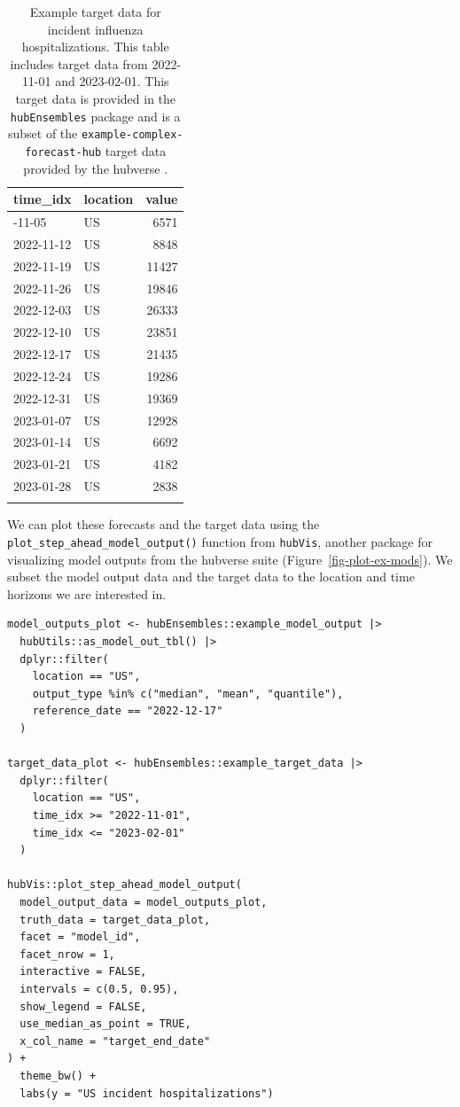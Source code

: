 \documentclass[
  article,
  shortnames,
  notitle]{jss}
\begin{document}
\begin{longtable}[]{@{}llr@{}}

\toprule\noalign{}
time\_idx & location & value \\
\midrule\noalign{}
\endhead
\bottomrule\noalign{}
\endlastfoot
2022-11-05 & US & 6571 \\
2022-11-12 & US & 8848 \\
2022-11-19 & US & 11427 \\
2022-11-26 & US & 19846 \\
2022-12-03 & US & 26333 \\
2022-12-10 & US & 23851 \\
2022-12-17 & US & 21435 \\
2022-12-24 & US & 19286 \\
2022-12-31 & US & 19369 \\
2023-01-07 & US & 12928 \\
2023-01-14 & US & 6692 \\
2023-01-21 & US & 4182 \\
2023-01-28 & US & 2838 \\


\caption{\label{tbl-example-target-data}Example target data for incident
influenza hospitalizations. This table includes target data from
2022-11-01 and 2023-02-01. This target data is provided in the
\texttt{hubEnsembles} package and is a subset of the
\texttt{example-complex-forecast-hub} target data provided by the
hubverse \citep{hubverse_docs}.}

\tabularnewline
\end{longtable}

We can plot these forecasts and the target data using the
\texttt{plot\_step\_ahead\_model\_output()} function from
\texttt{hubVis}, another package for visualizing model outputs from the
hubverse suite (Figure~\ref{fig-plot-ex-mods}). We subset the model
output data and the target data to the location and time horizons we are
interested in.

\begin{verbatim}
model_outputs_plot <- hubEnsembles::example_model_output |>
  hubUtils::as_model_out_tbl() |>
  dplyr::filter(
    location == "US",
    output_type %in% c("median", "mean", "quantile"),
    reference_date == "2022-12-17"
  )

target_data_plot <- hubEnsembles::example_target_data |>
  dplyr::filter(
    location == "US",
    time_idx >= "2022-11-01",
    time_idx <= "2023-02-01"
  )

hubVis::plot_step_ahead_model_output(
  model_output_data = model_outputs_plot,
  truth_data = target_data_plot,
  facet = "model_id",
  facet_nrow = 1,
  interactive = FALSE,
  intervals = c(0.5, 0.95),
  show_legend = FALSE,
  use_median_as_point = TRUE,
  x_col_name = "target_end_date"
) +
  theme_bw() +
  labs(y = "US incident hospitalizations")
\end{verbatim}
\end{document}
